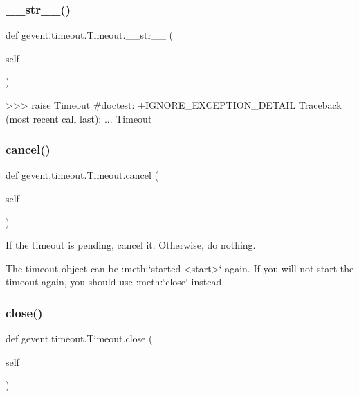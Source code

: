 \subsubsection{\texorpdfstring{\+\_\+\+\_\+str\+\_\+\+\_\+()}{\_\_str\_\_()}}
{\footnotesize\ttfamily def gevent.\+timeout.\+Timeout.\+\_\+\+\_\+str\+\_\+\+\_\+ (\begin{DoxyParamCaption}\item[{}]{self }\end{DoxyParamCaption})}

\begin{DoxyVerb}>>> raise Timeout #doctest: +IGNORE_EXCEPTION_DETAIL
Traceback (most recent call last):
    ...
Timeout
\end{DoxyVerb}
 \mbox{\label{classgevent_1_1timeout_1_1_timeout_a7c9775359278ff54e4653b2e8522ba7b}} 
\subsubsection{\texorpdfstring{cancel()}{cancel()}}
{\footnotesize\ttfamily def gevent.\+timeout.\+Timeout.\+cancel (\begin{DoxyParamCaption}\item[{}]{self }\end{DoxyParamCaption})}

\begin{DoxyVerb}If the timeout is pending, cancel it. Otherwise, do nothing.

The timeout object can be :meth:`started <start>` again. If
you will not start the timeout again, you should use
:meth:`close` instead.
\end{DoxyVerb}
 \mbox{\label{classgevent_1_1timeout_1_1_timeout_ac85307f16caa1c0de21b395c63a5fbb0}} 
\subsubsection{\texorpdfstring{close()}{close()}}
{\footnotesize\ttfamily def gevent.\+timeout.\+Timeout.\+close (\begin{DoxyParamCaption}\item[{}]{self }\end{DoxyParamCaption})}

